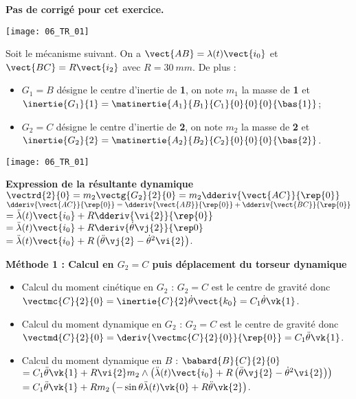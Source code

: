 \normaltrue
\correctiontrue


\setcounter{numques}{0}
\ifcorrection
\else
\textbf{Pas de corrigé pour cet exercice.}
\fi

\ifprof
\begin{marginfigure}
\texttt{[image: 06\_TR\_01]}
\end{marginfigure}

\else
Soit le mécanisme suivant. On a $\vect{AB}=\lambda(t)\vect{i_0}$ et $\vect{BC}=R\vect{i_2}$ avec $R=\SI{30}{mm}$.
De plus :
\begin{itemize}
\item $G_1=B$ désigne le centre d'inertie de \textbf{1}, on note $m_1$ la masse de \textbf{1} et $\inertie{G_1}{1}=\matinertie{A_1}{B_1}{C_1}{0}{0}{0}{\bas{1}}$; 
\item $G_2=C$ désigne le centre d'inertie de \textbf{2}, on note $m_2$ la masse de \textbf{2} et $\inertie{G_2}{2}=\matinertie{A_2}{B_2}{C_2}{0}{0}{0}{\bas{2}}$.
\end{itemize}
\begin{center}
\texttt{[image: 06\_TR\_01]}
\end{center}
\fi

\ifprof

\textbf{Expression de la résultante dynamique}
$\vectrd{2}{0}=m_2\vectg{G_2}{2}{0} = m_2\dderiv{\vect{AC}}{\rep{0}}$
$\dderiv{\vect{AC}}{\rep{0}}= \dderiv{\vect{AB}}{\rep{0}}+\dderiv{\vect{BC}}{\rep{0}}$
$= \ddot{\lambda}(t) \vect{i_0} + R \dderiv{\vi{2}}{\rep{0}}$
$= \ddot{\lambda}(t) \vect{i_0} + R \deriv{\dot{\theta} \vj{2}}{\rep0}$
$= \ddot{\lambda}(t) \vect{i_0} + R \left(\ddot{\theta} \vj{2} - \dot{\theta}^2 \vi{2}\right) $.



\textbf{Méthode 1 : Calcul en $G_2=C$ puis déplacement du torseur dynamique}
\begin{itemize}
\item Calcul du moment cinétique en $G_2$ : $G_2=C$ est le centre de gravité donc $\vectmc{C}{2}{0}=\inertie{C}{2}\dot{\theta}\vect{k_0} = C_1  \dot{\theta} \vk{1}$.
\item Calcul du moment dynamique en $G_2$ : $G_2=C$ est le centre de gravité donc $\vectmd{C}{2}{0}=\deriv{\vectmc{C}{2}{0}}{\rep{0}}= C_1  \ddot{\theta} \vk{1}$.
\item Calcul du moment dynamique en $B$ : $\babard{B}{C}{2}{0} $
$= C_1  \ddot{\theta} \vk{1} + R\vi{2}m_2\wedge\left(  \ddot{\lambda}(t) \vect{i_0} + R \left(\ddot{\theta} \vj{2} - \dot{\theta}^2 \vi{2}\right)\right)$
$= C_1  \ddot{\theta} \vk{1} + Rm_2\left( -\sin \theta \ddot{\lambda}(t) \vk{0} + R \ddot{\theta} \vk{2}\right)$.
\end{itemize}

